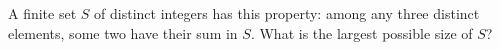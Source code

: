 A finite set $S$ of distinct integers has this property: among any three distinct elements, some two have their sum in $S$. What is the largest possible size of $S$?

